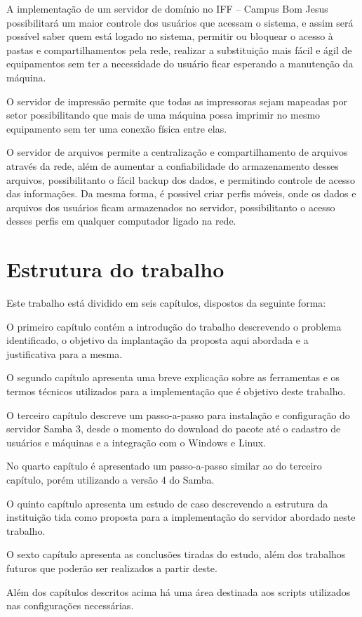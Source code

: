 A implementação de um servidor de domínio no IFF – Campus Bom Jesus possibilitará um maior controle dos usuários que acessam o sistema, e assim será possível saber quem está logado no sistema, permitir ou bloquear o acesso à pastas e compartilhamentos pela rede, realizar a substituição mais fácil e ágil de equipamentos sem ter a necessidade do usuário ficar esperando a manutenção da máquina.

O servidor de impressão permite que todas as impressoras sejam mapeadas por setor possibilitando que mais de uma máquina possa imprimir no mesmo equipamento sem ter uma conexão física entre elas.

O servidor de arquivos permite a centralização e compartilhamento de arquivos através da rede, além de aumentar a confiabilidade do armazenamento desses arquivos, possibilitanto o fácil backup dos dados, e permitindo controle de acesso das informações. Da mesma forma, é possivel criar perfis móveis, onde os dados e arquivos dos usuários ficam armazenados no servidor, possibilitanto o acesso desses perfis em qualquer computador ligado na rede.

\section{Estrutura do trabalho}

Este trabalho está dividido em seis capítulos, dispostos da seguinte forma:

O primeiro capítulo contém a introdução do trabalho descrevendo o problema identificado, o objetivo da implantação da proposta aqui abordada e a justificativa para a mesma.

O segundo capítulo apresenta uma breve explicação sobre as ferramentas e os termos técnicos utilizados para a implementação que é objetivo deste trabalho. 

O terceiro capítulo descreve um passo-a-passo para instalação e configuração do servidor Samba 3, desde o momento do download do pacote até o cadastro de usuários e máquinas e a integração com o Windows e Linux.

No quarto capítulo é apresentado um passo-a-passo similar ao do terceiro capítulo, porém utilizando a versão 4 do Samba.

O quinto capítulo apresenta um estudo de caso descrevendo a estrutura da instituição tida como proposta para a implementação do servidor abordado neste trabalho.

O sexto capítulo apresenta as conclusões tiradas do estudo, além dos trabalhos futuros que poderão ser realizados a partir deste.

Além dos capítulos descritos acima há uma área destinada aos scripts utilizados nas configurações necessárias.